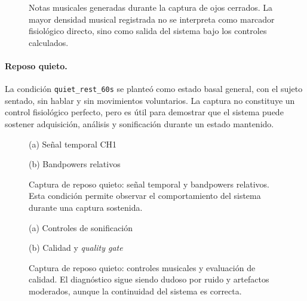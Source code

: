 \begin{figure}[htbp]
    \centering
    \caption{Notas musicales generadas durante la captura de ojos cerrados. La mayor densidad musical registrada no se interpreta como marcador fisiológico directo, sino como salida del sistema bajo los controles calculados.}
    \label{fig:validacion_s01_02_notes}
\end{figure}

\paragraph{Reposo quieto.}
La condición \texttt{quiet\_rest\_60s} se planteó como estado basal general, con el sujeto sentado, sin hablar y sin movimientos voluntarios. La captura no constituye un control fisiológico perfecto, pero es útil para demostrar que el sistema puede sostener adquisición, análisis y sonificación durante un estado mantenido.

\begin{figure}[htbp]
    \centering
    \begin{minipage}{0.49\textwidth}
        \centering
        \small (a) Señal temporal CH1
    \end{minipage}
    \hfill
    \begin{minipage}{0.49\textwidth}
        \centering
        \small (b) Bandpowers relativos
    \end{minipage}
    \caption{Captura de reposo quieto: señal temporal y bandpowers relativos. Esta condición permite observar el comportamiento del sistema durante una captura sostenida.}
    \label{fig:validacion_s01_03_eeg_bands}
\end{figure}

\begin{figure}[htbp]
    \centering
    \begin{minipage}{0.49\textwidth}
        \centering
        \small (a) Controles de sonificación
    \end{minipage}
    \hfill
    \begin{minipage}{0.49\textwidth}
        \centering
        \small (b) Calidad y \textit{quality gate}
    \end{minipage}
    \caption{Captura de reposo quieto: controles musicales y evaluación de calidad. El diagnóstico sigue siendo dudoso por ruido y artefactos moderados, aunque la continuidad del sistema es correcta.}
    \label{fig:validacion_s01_03_controls_quality}
\end{figure}

